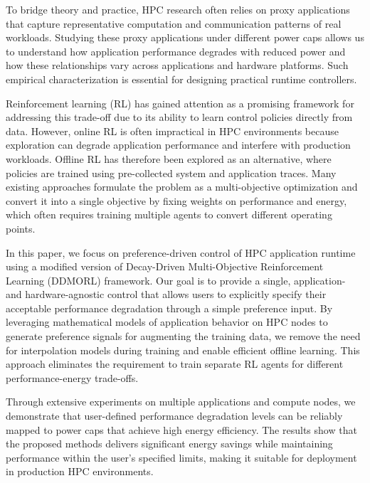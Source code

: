 To bridge theory and practice, HPC research often relies on proxy applications that capture representative computation and communication patterns of real workloads. Studying these proxy applications under different power caps allows us to understand how application performance degrades with reduced power and how these relationships vary across applications and hardware platforms. Such empirical characterization is essential for designing practical runtime controllers.

Reinforcement learning (RL) has gained attention as a promising framework for addressing this trade-off due to its ability to learn control policies directly from data. However, online RL is often impractical in HPC environments because exploration can degrade application performance and interfere with production workloads. Offline RL has therefore been explored as an alternative, where policies are trained using pre-collected system and application traces. Many existing approaches formulate the problem as a multi-objective optimization and convert it into a single objective by fixing weights on performance and energy, which often requires training multiple agents to convert different operating points.

In this paper, we focus on preference-driven control of HPC application runtime using a modified version of Decay-Driven Multi-Objective Reinforcement Learning (DDMORL) framework. Our goal is to provide a single, application- and hardware-agnostic control that allows users to explicitly specify their acceptable performance degradation through a simple preference input. By leveraging mathematical models of application behavior on HPC nodes to generate preference signals for augmenting the training data, we remove the need for interpolation models during training and enable efficient offline learning. This approach eliminates the requirement to train separate RL agents for different performance-energy trade-offs.

Through extensive experiments on multiple applications and compute nodes, we demonstrate that user-defined performance degradation levels can be reliably mapped to power caps that achieve high energy efficiency. The results show that the proposed methods delivers significant energy savings while maintaining performance within the user's specified limits, making it suitable for deployment in production HPC environments.